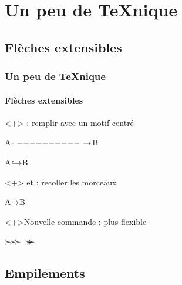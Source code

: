 \documentclass[10pt, aspectratio=3218]{beamer}
\begin{document}
\section{Un peu de \TeX{}nique}

\subsection{Flèches extensibles}

\begin{frame}[fragile]

\frametitle{Un peu de \TeX{}nique}
\framesubtitle{Flèches extensibles}

\begin{block}<+>{ : remplir avec un motif centré}
  \begin{dispExample}
A$ \lhook \cleaders\hbox{$-$}\hskip 3cm \relax \rightarrow $B \par
A$ \lhook \cleaders\hbox{$-$}\hfill     \relax \rightarrow $B
  \end{dispExample}
\end{block}

\begin{block}<+>{ et  : recoller les morceaux}
  \begin{dispExample}
A$ \mathrel{\lhook} \joinrel
  \cleaders\hbox{$\joinrel\mathrel{-}\joinrel$}\hfill \relax
  \joinrel \mathrel{\rightarrow} $B
  \end{dispExample}
\end{block}

\begin{alertblock}<+>{Nouvelle commande  : plus flexible}
  \begin{dispExample}
$ \mathrel\succ\joinrel\mathrel\succ\joinrel\mathrel\succ $\qquad
$ \succ\xjoinrel[10]\succ\xjoinrel[10]\succ $
  \end{dispExample}
\end{alertblock}

\end{frame}

\subsection{Empilements}
\end{document}
